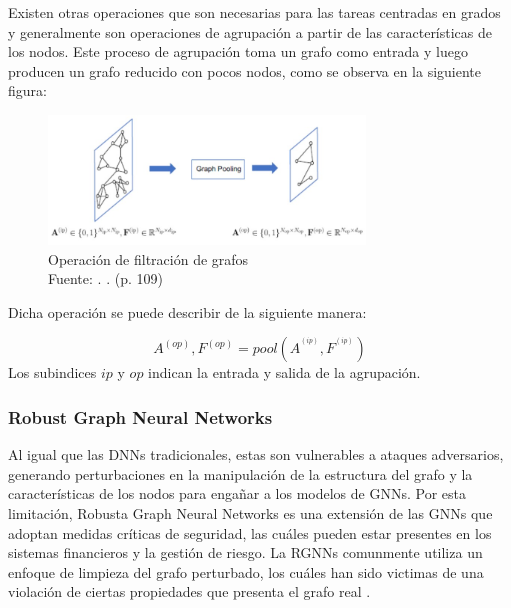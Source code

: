 Existen otras operaciones que son necesarias para las tareas centradas en grados y generalmente son operaciones de agrupación a partir de las características de los nodos. Este proceso de agrupación toma un grafo como entrada y luego producen un grafo reducido con pocos nodos, como se observa en la siguiente figura:

\begin{figure}[h]
	\begin{center}
		\includegraphics[width=0.75\textwidth]{2/MT/8.jpg}
		\caption{Operación de filtración de grafos \\
			Fuente: \citep*{bk_grafo}. . (p. 109)}
		\label{1:fig2}
	\end{center}
\end{figure}

Dicha operación se puede describir de la siguiente manera:


\begin{equation}
	A^{(op)},F^{(op)}= pool(A^{^{(ip)}},F^{^{(ip)}})
\end{equation}
Los subindices $ip$ y $op$ indican la entrada y salida de la agrupación.



\subsubsection{Robust Graph Neural Networks}
Al igual que las DNNs tradicionales, estas son vulnerables a ataques adversarios, generando perturbaciones en la manipulación de la estructura del grafo y la características de los nodos para engañar a los modelos de GNNs. Por esta limitación, Robusta Graph Neural Networks es una extensión de las GNNs que adoptan medidas críticas de seguridad, las cuáles pueden estar presentes en los sistemas financieros y la gestión de riesgo. La RGNNs comunmente utiliza un enfoque de limpieza del grafo perturbado, los cuáles han sido victimas de una violación de ciertas propiedades que presenta el grafo real \parencite{jin2020graph}.


